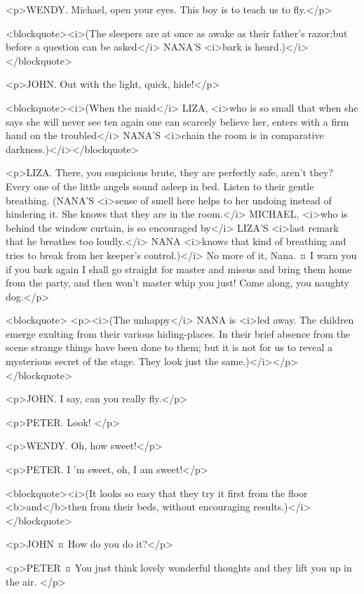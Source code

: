 <p>WENDY. Michael, open your eyes. This boy is to teach us to fly.</p>

<blockquote><i>(The sleepers are at once as awake as their father's razor;but before a question can be asked</i> NANA'S <i>bark is heard.)</i></blockquote>

<p>JOHN. Out with the light, quick, hide!</p>

<blockquote><i>(When the maid</i> LIZA, <i>who is so small that when she says she will never see ten again one can scarcely believe her, enters with a firm hand on the troubled</i> NANA'S <i>chain the room is in comparative darkness.)</i></blockquote>

<p>LIZA. There, you suspicious brute, they are perfectly safe, aren't they? Every one of the little angels sound asleep in bed. Listen to their gentle breathing. (NANA'S <i>sense of smell here helps to her undoing instead of hindering it. She knows that they are in the room.</i> MICHAEL, <i>who is behind the window curtain, is so encouraged by</i> LIZA'S <i>last remark that he breathes too loudly.</i> NANA <i>knows that kind of breathing and tries to break from her keeper's control.)</i> No more of it, Nana.
¤
I warn you if you bark again I shall go straight for master and missus and bring them home from the party, and then won't master whip you just! Come along, you naughty dog.</p>

<blockquote> <p><i>(The unhappy</i> NANA is <i>led away. The children emerge exulting from their various hiding-places. In their brief absence from the scene strange things have been done to them; but it is not for us to reveal a mysterious secret of the stage. They look just the same.)</i></p> </blockquote>

<p>JOHN. I say, can you really fly.</p>

<p>PETER. Look!
</p>

<p>WENDY. Oh, how sweet!</p>

<p>PETER. I 'm sweet, oh, I am sweet!</p>

<blockquote><i>(It looks so easy that they try it first from the floor <b>and</b>then from their beds, without encouraging results.)</i></blockquote>

<p>JOHN ¤
How do you do it?</p>

<p>PETER ¤
You just think lovely wonderful thoughts and they lift you up in the air.
</p>

